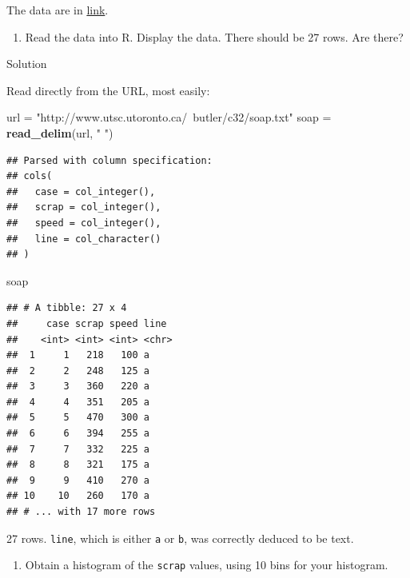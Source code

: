\documentclass[]{tufte-book}
\newenvironment{Shaded}{}{}
\newcommand{\KeywordTok}[1]{\textcolor[rgb]{0.00,0.44,0.13}{\textbf{#1}}}
\newcommand{\NormalTok}[1]{#1}
\newcommand{\StringTok}[1]{\textcolor[rgb]{0.25,0.44,0.63}{#1}}
\providecommand{\tightlist}{%
  \setlength{\itemsep}{0pt}\setlength{\parskip}{0pt}}
\theoremstyle{definition}
\theoremstyle{definition}
\theoremstyle{definition}
\theoremstyle{remark}
\begin{document}
The data are in
\href{http://www.utsc.utoronto.ca/~butler/c32/soap.txt}{link}.

\begin{enumerate}
\def\labelenumi{(\alph{enumi})}
\tightlist
\item
  Read the data into R. Display the data. There should be 27 rows. Are
  there?
\end{enumerate}

Solution

Read directly from the URL, most easily:

\begin{Shaded}
\begin{Highlighting}[]
\NormalTok{url =}\StringTok{ "http://www.utsc.utoronto.ca/~butler/c32/soap.txt"}
\NormalTok{soap =}\StringTok{ }\KeywordTok{read_delim}\NormalTok{(url, }\StringTok{" "}\NormalTok{)}
\end{Highlighting}
\end{Shaded}

\begin{verbatim}
## Parsed with column specification:
## cols(
##   case = col_integer(),
##   scrap = col_integer(),
##   speed = col_integer(),
##   line = col_character()
## )
\end{verbatim}

\begin{Shaded}
\begin{Highlighting}[]
\NormalTok{soap}
\end{Highlighting}
\end{Shaded}

\begin{verbatim}
## # A tibble: 27 x 4
##     case scrap speed line 
##    <int> <int> <int> <chr>
##  1     1   218   100 a    
##  2     2   248   125 a    
##  3     3   360   220 a    
##  4     4   351   205 a    
##  5     5   470   300 a    
##  6     6   394   255 a    
##  7     7   332   225 a    
##  8     8   321   175 a    
##  9     9   410   270 a    
## 10    10   260   170 a    
## # ... with 17 more rows
\end{verbatim}

27 rows. \texttt{line}, which is either \texttt{a} or \texttt{b}, was
correctly deduced to be text.

\begin{enumerate}
\def\labelenumi{(\alph{enumi})}
\setcounter{enumi}{1}
\tightlist
\item
  Obtain a histogram of the \texttt{scrap} values, using 10 bins for
  your histogram.
\end{enumerate}
\end{document}
